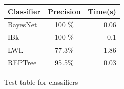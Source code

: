 \begin{figure}[h]
\begin{center}
\begin{tabular}{ l  c r }
Classifier & Precision & Time(s)\\ [0.5ex]
\hline \hline
BayesNet & 100 \%  & 0.06\\ 
IBk & 100 \% & 0.1 \\
LWL & 77.3\%  & 1.86\\
REPTree & 95.5\%  & 0.03 \\ [1ex]
\end{tabular}
\end{center}
\caption{Test table for classifiers}
\label{fig:wekaclass}
\end{figure}



